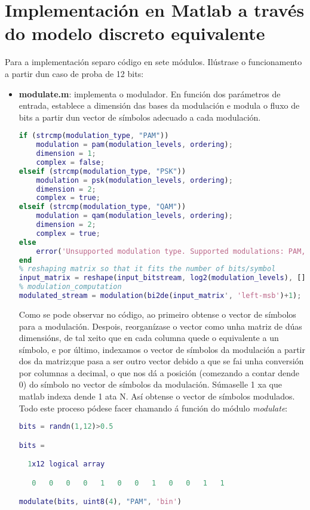 \documentclass[
	10pt, %
	spanish, %
]{fphw}
\begin{document}
\section*{Implementación en Matlab a través do modelo discreto equivalente}
Para a implementación separo código en sete módulos. Ilústrase o funcionamento a partir dun caso de proba de 12 bits:
\begin{itemize}
\item \textbf{modulate.m}: implementa o modulador. En función dos parámetros de entrada, establece a dimensión das bases da modulación e modula o fluxo de bits a partir dun vector de símbolos adecuado a cada modulación. 
\begin{lstlisting}[language=matlab]
% modulation type checking and modulation computation
if (strcmp(modulation_type, "PAM"))
	modulation = pam(modulation_levels, ordering);
	dimension = 1;
	complex = false;
elseif (strcmp(modulation_type, "PSK"))
	modulation = psk(modulation_levels, ordering);
	dimension = 2;
	complex = true;
elseif (strcmp(modulation_type, "QAM"))
	modulation = qam(modulation_levels, ordering);
	dimension = 2;
	complex = true;
else
	error('Unsupported modulation type. Supported modulations: PAM, PSK, QAM');
end
% reshaping matrix so that it fits the number of bits/symbol
input_matrix = reshape(input_bitstream, log2(modulation_levels), []);
% modulation_computation
modulated_stream = modulation(bi2de(input_matrix', 'left-msb')+1);
\end{lstlisting}
Como se pode observar no código, ao primeiro obtense o vector de símbolos para a modulación. Despois, reorganízase o vector como unha matriz de dúas dimensións, de tal xeito que en cada columna quede o equivalente a un símbolo, e por último, indexamos o vector de símbolos da modulación a partir dos da matriz;que pasa a ser outro vector debido a que se fai unha conversión por columnas a decimal, o que nos dá a posición (comezando a contar dende 0) do símbolo no vector de símbolos da modulación. Súmaselle 1 xa que matlab indexa dende 1 ata N. Así obtense o vector de símbolos modulados. Todo este proceso pódese facer chamando á función do módulo \textit{modulate}:
\begin{lstlisting}[language=matlab]
bits = randn(1,12)>0.5

bits =

  1x12 logical array

   0   0   0   0   1   0   0   1   0   0   1   1

modulate(bits, uint8(4), "PAM", 'bin')


\end{lstlisting}
\end{itemize}
\end{document}
